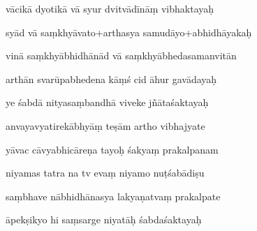 \documentclass[article,12pt,a4paper]{memoir}%
\newcounter{parCount}
\begin{document}
	  
	  \pstart {} vācikā dyotikā vā syur dvitvādīnāṃ vibhaktayaḥ 
	{}
	\pend%
      

	  
	  \pstart \leavevmode%
	syād vā saṃkhyāvato+arthasya samudāyo+abhidhāyakaḥ 
	{}
	\pend%
      

	  
	  \pstart {} vinā saṃkhyābhidhānād vā saṃkhyābhedasamanvitān 
	{}
	\pend%
      

	  
	  \pstart \leavevmode%
	arthān svarūpabhedena kāṃś cid āhur gavādayaḥ 
	{}
	\pend%
      

	  
	  \pstart {} ye śabdā nityasaṃbandhā viveke jñātaśaktayaḥ 
	{}
	\pend%
      

	  
	  \pstart \leavevmode%
	anvayavyatirekābhyāṃ teṣām artho vibhajyate 
	{}
	\pend%
      

	  
	  \pstart {} yāvac cāvyabhicāreṇa tayoḥ śakyaṃ prakalpanam 
	{}
	\pend%
      

	  
	  \pstart \leavevmode%
	niyamas tatra na tv evaṃ niyamo nuṭśabādiṣu 
	{}
	\pend%
      

	  
	  \pstart {} saṃbhave nābhidhānasya lakyaṇatvaṃ prakalpate 
	{}
	\pend%
      

	  
	  \pstart \leavevmode%
	āpekṣikyo hi saṃsarge niyatāḥ śabdaśaktayaḥ 
	{}
	\pend%
      
\end{document}
